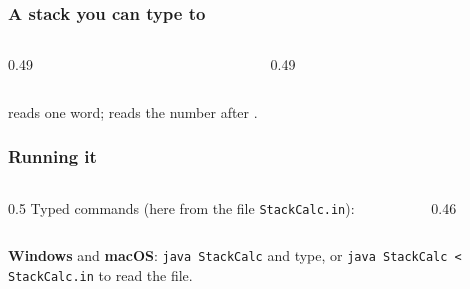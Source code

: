 \documentclass[aspectratio=169,10pt,compress]{beamer}
\newcommand{\win}{\textbf{Windows}}
\newcommand{\mac}{\textbf{macOS}}
\begin{document}
\begin{frame}[t,fragile] \frametitle{A stack you can type to}
  \begin{columns}[T]
    \begin{column}{0.49\textwidth}
    \end{column}
    \begin{column}{0.49\textwidth}
    \end{column}
  \end{columns}
  \small {} reads one word;  reads the number after .
\end{frame}




\begin{frame}[t,fragile] \frametitle{Running it}
  \begin{columns}[T]
    \begin{column}{0.5\textwidth}
      \small Typed commands (here from the file \texttt{StackCalc.in}):
    \end{column}
    \begin{column}{0.46\textwidth}
    \end{column}
  \end{columns}
  \small \win{} and \mac: \texttt{java StackCalc} and type, or \texttt{java StackCalc < StackCalc.in} to read the file.
\end{frame}
\end{document}
